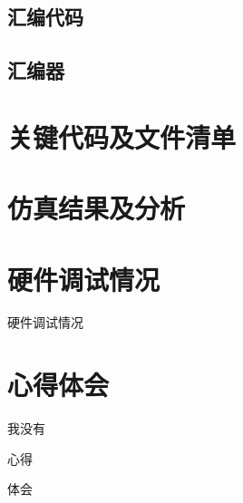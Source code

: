 \documentclass{article}
\begin{document}
        \subsection{汇编代码}
        
        \subsection{汇编器}

    \section{关键代码及文件清单}

    \section{仿真结果及分析}

    \section{硬件调试情况}
        硬件调试情况

    \section{心得体会}

        \begin{enumerate}
            \begin{item}
                我没有
            \end{item}
            \begin{item}
                心得
            \end{item}
            \begin{item}
                体会
            \end{item}
        \end{enumerate}
\end{document}
